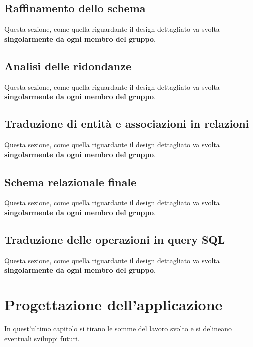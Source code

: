 \documentclass[a4paper,12pt]{report}
\begin{document}

\section{Raffinamento dello schema}

Questa sezione, come quella riguardante il design dettagliato va svolta \textbf{singolarmente da ogni membro del gruppo}.


\section{Analisi delle ridondanze}

Questa sezione, come quella riguardante il design dettagliato va svolta \textbf{singolarmente da ogni membro del gruppo}.


\section{Traduzione di entità e associazioni in relazioni}

Questa sezione, come quella riguardante il design dettagliato va svolta \textbf{singolarmente da ogni membro del gruppo}.


\section{Schema relazionale finale}

Questa sezione, come quella riguardante il design dettagliato va svolta \textbf{singolarmente da ogni membro del gruppo}.


\section{Traduzione delle operazioni in query SQL}

Questa sezione, come quella riguardante il design dettagliato va svolta \textbf{singolarmente da ogni membro del gruppo}.



\chapter{Progettazione dell'applicazione}

In quest'ultimo capitolo si tirano le somme del lavoro svolto e si delineano eventuali sviluppi
futuri.
\end{document}
